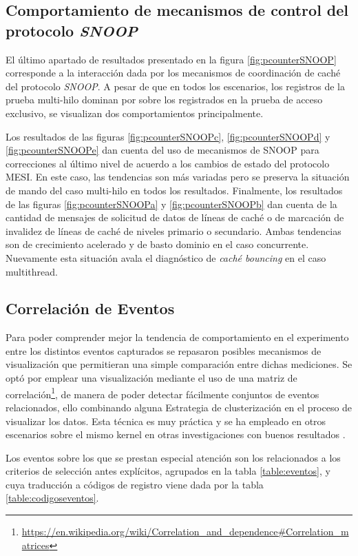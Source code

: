 \subsection{Comportamiento de mecanismos de control del protocolo \emph{SNOOP}}
El último apartado de resultados presentado en la figura \ref{fig:pcounterSNOOP} corresponde a la interacción dada por los mecanismos de coordinación de caché del protocolo \emph{SNOOP}. A pesar de que en todos los escenarios, los registros de la prueba multi-hilo dominan por sobre los registrados en la prueba de acceso exclusivo, se visualizan dos comportamientos principalmente.

Los resultados de las figuras \ref{fig:pcounterSNOOPc}, \ref{fig:pcounterSNOOPd} y \ref{fig:pcounterSNOOPe} dan cuenta del uso de mecanismos de SNOOP para correcciones al último nivel de acuerdo a los cambios de estado del protocolo MESI. En este caso, las tendencias son más variadas pero se preserva la situación de mando del caso multi-hilo en todos los resultados. Finalmente, los resultados de las figuras \ref{fig:pcounterSNOOPa} y \ref{fig:pcounterSNOOPb} dan cuenta de la cantidad de mensajes de solicitud de datos de líneas de caché o de marcación de invalidez de líneas de caché de niveles primario o secundario. Ambas tendencias son de crecimiento acelerado y de basto dominio en el caso concurrente. Nuevamente esta situación avala el diagnóstico de \emph{caché bouncing} en el caso multithread.

\subsection{Correlación de Eventos}
Para poder comprender mejor la tendencia de comportamiento en el experimento entre los distintos eventos capturados se repasaron posibles mecanismos de visualización que permitieran una simple comparación entre dichas mediciones. Se optó por emplear una visualización mediante el uso de una matriz de correlación\footnote{\url{https://en.wikipedia.org/wiki/Correlation_and_dependence#Correlation_matrices}}, de manera de poder detectar fácilmente conjuntos de eventos relacionados, ello combinando alguna Estrategia de clusterización en el proceso de visualizar los datos. Esta técnica es muy práctica y se ha empleado en otros escenarios sobre el mismo kernel en otras investigaciones con buenos resultados \cite{paper:clusteringKernel}.

Los eventos sobre los que se prestan especial atención son los relacionados a los criterios de selección antes explícitos, agrupados en la tabla \ref{table:eventos}, y cuya traducción a códigos de registro viene dada por la tabla \ref{table:codigoseventos}.

